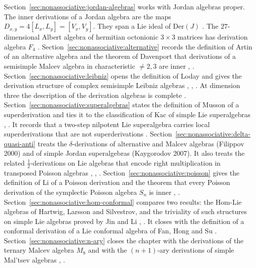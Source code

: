 Section~\ref{sec:nonassociative:jordan-algebras} works with Jordan
algebras proper. The inner derivations of a Jordan algebra are the maps
$D_{x,y}=4[L_x,L_y]=[V_x,V_y]$. They span a Lie ideal of $\mathrm{Der}(J)$
\cite[Problem~3.6, p.~185]{McCrimmon2004Taste}. The $27$-dimensional
Albert algebra of hermitian octonionic $3\times 3$ matrices has derivation
algebra $F_4$ \cite[p.~52]{McCrimmon2004Taste}.
Section~\ref{sec:nonassociative:alternative} records the definition of Artin
of an alternative algebra and the theorem of Davenport that derivations of a
semisimple Malcev algebra in characteristic $\neq 2,3$ are inner
\cite[p.~148]{Baez2002Octonions}, \cite[p.~565]{Davenport1972Malcev}.
Section~\ref{sec:nonassociative:leibniz} opens the definition of Loday and
gives the derivation structure of complex semisimple Leibniz algebras
\cite[Definition~(1.1), p.~141]{LodayPirashvili1993},
\cite[Theorem~4.5]{AyupovKudaybergenovOmirovZhao2019},
\cite[Proposition~3.5, p.~2193]{BiyogmamTcheka2021Outer}. At dimension
three the description of the derivation algebras is complete
\cite[Theorem~1.1, p.~2]{KurdachenkoPypkaSemko2026}.
Section~\ref{sec:nonassociative:superalgebras} states the definition of Musson
of a superderivation and ties it to the classification of Kac of simple
Lie superalgebras \cite[Lemma~1.1.2, p.~2]{Musson2012},
\cite[p.~1375]{Kac1977Classification}. It records that a two-step nilpotent
Lie superalgebra carries local superderivations that are not
superderivations \cite[Theorems~3.2 and 3.5, pp.~7, 12]{ChiZhangMengTang2026}.
Section~\ref{sec:nonassociative:delta-quasi-anti} treats the
$\delta$-derivations of alternative and Malcev algebras (Filippov 2000)
and of simple Jordan superalgebras (Kaygorodov 2007). It also treats the
related $\tfrac{1}{2}$-derivations on Lie algebras that encode right
multiplication in transposed Poisson algebras
\cite[Theorems~2 and~3, pp.~356--358]{Filippov2000DeltaAlternative},
\cite[Theorems~2.5 and~4.4]{KacKaygorodov2007Delta},
\cite[Definition~5, p.~4]{FerreiraKaygorodovLopatkin21}.
Section~\ref{sec:nonassociative:poisson} gives the definition of Li of a
Poisson derivation and the theorem that every Poisson derivation of the
symplectic Poisson algebra $S_n$ is inner
\cite[Definitions, p.~658]{AlbertiArestiLi2018Poisson},
\cite[Theorem~2.1, pp.~658--659]{AlbertiArestiLi2018Poisson}.
Section~\ref{sec:nonassociative:hom-conformal} compares two results: the
Hom-Lie algebras of Hartwig, Larsson and Silvestrov, and the triviality
of such structures on simple Lie algebras proved by Jin and Li
\cite[Definition~4, p.~18]{HartwigLarssonSilvestrov2006},
\cite[Proposition~2.2, p.~1400]{JinLi2008HomLie}. It closes with the
definition of a conformal derivation of a Lie conformal algebra of Fan,
Hong and Su \cite[Definitions~2.1 and~2.7, pp.~2--3]{FanHongSu2019}.
Section~\ref{sec:nonassociative:n-ary} closes the chapter with the
derivations of the ternary Malcev algebra $M_8$ and with the
$(n+1)$-ary derivations of simple Mal'tsev algebras
\cite[Theorem~2.3, p.~3598]{PojidaevSarahva2006},
\cite[Theorem~5, p.~582]{Kaygorodov2014n1aryMaltsev}.

